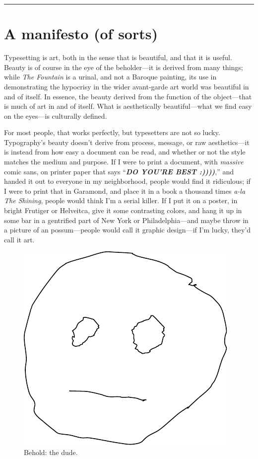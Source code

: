 \documentclass[%
	english,%
	 a4paper,%
	titlepage,%
	fleqn]{article}
\begin{document}
{
\hypersetup{linkcolor=black}
\setcounter{tocdepth}{3}
\tableofcontents
}

\noindent\rule{\linewidth}{0.05em}

\newpage




\hypertarget{a-manifesto-of-sorts}{%
\section{A manifesto (of sorts)}\label{a-manifesto-of-sorts}}

Typesetting is art, both in the sense that is beautiful, and that it is
useful. Beauty is of course in the eye of the beholder---it is derived
from many things; while \emph{The Fountain} is a urinal, and not a
Baroque painting, its use in demonstrating the hypocrisy in the wider
avant-garde art world was beautiful in and of itself. In essence, the
beauty derived from the function of the object---that is much of art in
and of itself. What is aesthetically beautiful---what we find easy on
the eyes---is culturally defined.

For most people, that works perfectly, but typesetters are not so lucky.
Typography's beauty doesn't derive from process, message, or raw
aesthetics---it is instead from how easy a document can be read, and
whether or not the style matches the medium and purpose. If I were to
print a document, with \emph{massive} comic sans, on printer paper that
says ``\textbf{\emph{DO YOU'RE BEST :))))}},'' and handed it out to
everyone in my neighborhood, people would find it ridiculous; if I were
to print that in Garamond, and place it in a book a thousand times
\emph{a-la The Shining}, people would think I'm a serial killer. If I
put it on a poster, in bright Frutiger or Helveitca, give it some
contrasting colors, and hang it up in some bar in a gentrified part of
New York or Philadelphia---and maybe throw in a picture of an
possum---people would call it graphic design---if I'm lucky, they'd call
it art.

\begin{figure}
\centering
\includegraphics{img/theDude.pdf}
\caption{Behold: the dude.}
\end{figure}
\end{document}
